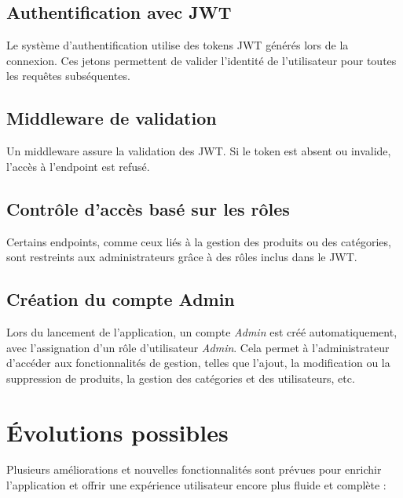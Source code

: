 \subsection*{Authentification avec JWT}
Le système d'authentification utilise des tokens JWT générés lors de la connexion. Ces jetons permettent de valider l'identité de l'utilisateur pour toutes les requêtes subséquentes.

\subsection*{Middleware de validation}
Un middleware assure la validation des JWT. Si le token est absent ou invalide, l'accès à l'endpoint est refusé.

\subsection*{Contrôle d'accès basé sur les rôles}
Certains endpoints, comme ceux liés à la gestion des produits ou des catégories, sont restreints aux administrateurs grâce à des rôles inclus dans le JWT.

\subsection{Création du compte Admin}
Lors du lancement de l'application, un compte \textit{Admin} est créé automatiquement, avec l'assignation d'un rôle d'utilisateur \textit{Admin}. Cela permet à l'administrateur d'accéder aux fonctionnalités de gestion, telles que l'ajout, la modification ou la suppression de produits, la gestion des catégories et des utilisateurs, etc.

\section{Évolutions possibles}

Plusieurs améliorations et nouvelles fonctionnalités sont prévues pour enrichir l’application et offrir une expérience utilisateur encore plus fluide et complète :

